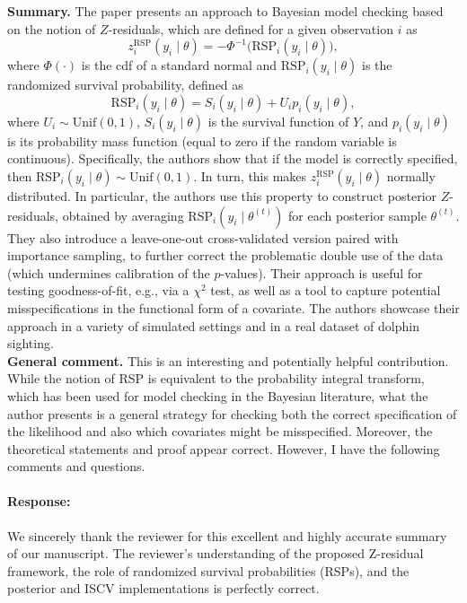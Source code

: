 \documentclass[11pt]{article}
\newcommand*{\mybox}[2]{%
  \par\medskip\noindent
  \colorbox{#1!30}{\parbox{.98\linewidth}{#2}}%
  \par\medskip
}
\begin{document}
\mybox{gray}{\textbf{Summary.} The paper presents an approach to Bayesian model checking based on the notion of $Z$-residuals, which are defined for a given observation $i$ as
\[
z_i^{\mathrm{RSP}}(y_i \mid \theta) = -\Phi^{-1}\!\bigl(\mathrm{RSP}_i(y_i \mid \theta)\bigr),
\]
where $\Phi(\cdot)$ is the cdf of a standard normal and $\mathrm{RSP}_i(y_i \mid \theta)$ is the randomized survival probability, defined as
\[
\mathrm{RSP}_i(y_i \mid \theta) = S_i(y_i \mid \theta) + U_i p_i(y_i \mid \theta),
\]
where $U_i \sim \mathrm{Unif}(0,1)$, $S_i(y_i \mid \theta)$ is the survival function of $Y$, and $p_i(y_i \mid \theta)$ is its probability mass function (equal to zero if the random variable is continuous). Specifically, the authors show that if the model is correctly specified, then $\mathrm{RSP}_i(y_i \mid \theta) \sim \mathrm{Unif}(0,1)$. In turn, this makes $z_i^{\mathrm{RSP}}(y_i \mid \theta)$ normally distributed. In particular, the authors use this property to construct posterior $Z$-residuals, obtained by averaging $\mathrm{RSP}_i(y_i \mid \theta^{(t)})$ for each posterior sample $\theta^{(t)}$. They also introduce a leave-one-out cross-validated version paired with importance sampling, to further correct the problematic double use of the data (which undermines calibration of the $p$-values). Their approach is useful for testing goodness-of-fit, e.g., via a $\chi^2$ test, as well as a tool to capture potential misspecifications in the functional form of a covariate. The authors showcase their approach in a variety of simulated settings and in a real dataset of dolphin sighting. \\[5pt]
\textbf{General comment.} This is an interesting and potentially helpful contribution. While the notion of RSP is equivalent to the probability integral transform, which has been used for model checking in the Bayesian literature, what the author presents is a general strategy for checking both the correct specification of the likelihood and also which covariates might be misspecified. Moreover, the theoretical statements and proof appear correct. However, I have the following comments and questions.
}

\paragraph{Response:}

We sincerely thank the reviewer for this excellent and highly accurate summary of our manuscript. The reviewer's understanding of the proposed Z-residual framework, the role of randomized survival probabilities (RSPs), and the posterior and ISCV implementations is perfectly correct.
\end{document}
